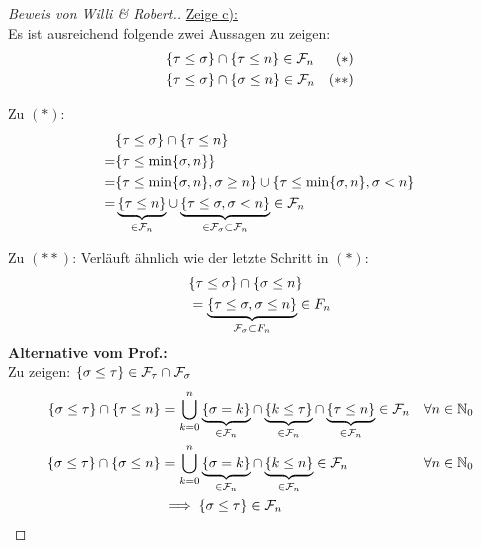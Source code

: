 \documentclass[12pt,a4paper]{article}
\begin{document}
\begin{proof}[Beweis von Willi \& Robert.]
\underline{Zeige c):}\\
Es ist ausreichend folgende zwei Aussagen zu zeigen:
\begin{align*}
	\lbrace \tau \leq \sigma\rbrace &\cap \lbrace \tau \leq n\rbrace \in \mathcal{F}_n &(\ast)&\\
	\lbrace \tau \leq \sigma\rbrace &\cap \lbrace \sigma \leq n\rbrace \in \mathcal{F}_n &(\ast\ast)& \\
\end{align*}

Zu $(\ast)$:
\begin{align*}
	&\lbrace \tau \leq \sigma\rbrace \cap \lbrace \tau \leq n\rbrace\\
	=&\lbrace \tau \leq \min\{\sigma, n\}\rbrace  \\
	=&\lbrace \tau \leq \min\{\sigma, n\}, \sigma \geq n\rbrace \cup 
	\lbrace \tau \leq \min\{\sigma, n\}, \sigma < n\rbrace \\
	=&\underbrace{\lbrace \tau \leq n\rbrace}_{\in \mathcal{F}_n} \cup
	\underbrace{\lbrace \tau \leq \sigma, \sigma < n\rbrace}_{\in \mathcal{F}_\sigma \subset \mathcal{F}_n} \in \mathcal{F}_n \\
\end{align*}

Zu $(\ast\ast)$:
Verläuft ähnlich wie der letzte Schritt in $(\ast)$:
\begin{align*}
	&\lbrace \tau \leq \sigma\rbrace \cap \lbrace \sigma \leq n\rbrace \\
	&=\underbrace{\lbrace \tau \leq \sigma, \sigma \leq n\rbrace}_{\mathcal{F}_\sigma \subset F_n} \in F_n \\
\end{align*}
\textbf{Alternative vom Prof.:}\\
Zu zeigen: $\lbrace\sigma\leq\tau\rbrace\in\mathcal{F}_\tau\cap\mathcal{F}_\sigma$
\begin{align*}
\lbrace\sigma\leq\tau\rbrace\cap\lbrace\tau\leq n\rbrace
&=\bigcup\limits_{k=0}^n\underbrace{\lbrace \sigma=k\rbrace}_{\in\mathcal{F}_n}\cap\underbrace{\lbrace k\leq\tau\rbrace}_{\in\mathcal{F}_n}\cap\underbrace{\lbrace\tau\leq n\rbrace}_{\in\mathcal{F}_n}\in\mathcal{F}_n &\forall n\in\mathbb{N}_0\\
\lbrace\sigma\leq\tau\rbrace\cap\lbrace\sigma\leq n\rbrace
&=\bigcup\limits_{k=0}^n\underbrace{\lbrace\sigma=k\rbrace}_{\in \mathcal{F}_n}\cap\underbrace{\lbrace k\leq n\rbrace}_{\in\mathcal{F}_n}\in\mathcal{F}_n &\forall n\in\mathbb{N}_0\\
&\implies\lbrace\sigma\leq\tau\rbrace\in\mathcal{F}_n
\end{align*}


\end{proof}
\end{document}
